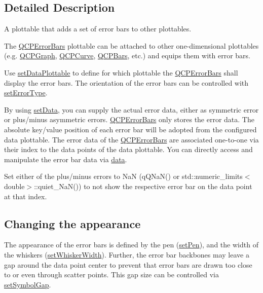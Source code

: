\subsection{Detailed Description}
A plottable that adds a set of error bars to other plottables. 



The \hyperlink{class_q_c_p_error_bars}{Q\+C\+P\+Error\+Bars} plottable can be attached to other one-\/dimensional plottables (e.\+g. \hyperlink{class_q_c_p_graph}{Q\+C\+P\+Graph}, \hyperlink{class_q_c_p_curve}{Q\+C\+P\+Curve}, \hyperlink{class_q_c_p_bars}{Q\+C\+P\+Bars}, etc.) and equips them with error bars.

Use \hyperlink{class_q_c_p_error_bars_aabb42a964cfbf780cd1c79850c7cd989}{set\+Data\+Plottable} to define for which plottable the \hyperlink{class_q_c_p_error_bars}{Q\+C\+P\+Error\+Bars} shall display the error bars. The orientation of the error bars can be controlled with \hyperlink{class_q_c_p_error_bars_af0af493d454a8f3a0908830160680d2b}{set\+Error\+Type}.

By using \hyperlink{class_q_c_p_error_bars_a92b1980003255f5f7c05407a4d92aabc}{set\+Data}, you can supply the actual error data, either as symmetric error or plus/minus asymmetric errors. \hyperlink{class_q_c_p_error_bars}{Q\+C\+P\+Error\+Bars} only stores the error data. The absolute key/value position of each error bar will be adopted from the configured data plottable. The error data of the \hyperlink{class_q_c_p_error_bars}{Q\+C\+P\+Error\+Bars} are associated one-\/to-\/one via their index to the data points of the data plottable. You can directly access and manipulate the error bar data via \hyperlink{class_q_c_p_error_bars_aeebd1b14f4c3573565efafd514988813}{data}.

Set either of the plus/minus errors to NaN ({\ttfamily q\+Q\+Na\+N()} or {\ttfamily std\+::numeric\+\_\+limits$<$double$>$\+::quiet\+\_\+\+Na\+N()}) to not show the respective error bar on the data point at that index.\hypertarget{class_q_c_p_error_bars_qcperrorbars-appearance}{}\subsection{Changing the appearance}\label{class_q_c_p_error_bars_qcperrorbars-appearance}
The appearance of the error bars is defined by the pen (\hyperlink{class_q_c_p_abstract_plottable_ab74b09ae4c0e7e13142fe4b5bf46cac7}{set\+Pen}), and the width of the whiskers (\hyperlink{class_q_c_p_error_bars_ad05f6ff9e46c6047f1cd2459744b7b59}{set\+Whisker\+Width}). Further, the error bar backbones may leave a gap around the data point center to prevent that error bars are drawn too close to or even through scatter points. This gap size can be controlled via \hyperlink{class_q_c_p_error_bars_a280ee8d863d8a2630c309701d019b3de}{set\+Symbol\+Gap}. 

